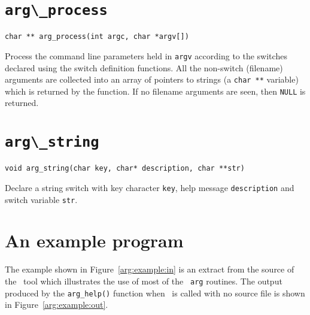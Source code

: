 \section{\protect\verb+arg\_process+}
\begin{verbatim}
char ** arg_process(int argc, char *argv[])
\end{verbatim}
Process the command line parameters held in {\tt argv} according to the switches declared
using the switch definition functions. All the non-switch (filename) arguments are collected into
an array of pointers to strings (a {\tt char **} variable) which is returned by the function.
If no filename arguments are seen, then {\tt NULL} is returned.

\section{\protect\verb+arg\_string+}
\begin{verbatim}
void arg_string(char key, char* description, char **str)
\end{verbatim}
Declare a string switch with key character {\tt key}, help message {\tt description} and
switch variable {\tt str}.

\section{An example program}

The example shown in Figure~\ref{arg:example:in} is an extract from the
source of the \rdp\ tool which illustrates the use of most of the {\tt
arg} routines. The output produced by the \verb+arg_help()+ function when \rdp\ is called
with no source file is shown in Figure~\ref{arg:example:out}.

